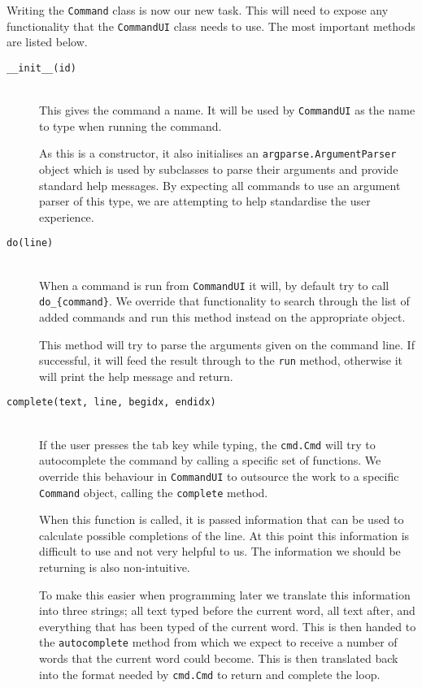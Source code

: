 \documentclass[twoside,a4paper]{report}
\begin{document}
Writing the \texttt{Command} class is now our new task. This will need to expose any functionality that the \texttt{CommandUI} class needs to use. The
most important methods are listed below.

\begin{description}
\item[\texttt{\_\_init\_\_(id)}] \hfill \\
This gives the command a name. It will be used by \texttt{CommandUI} as the name to type when running the command.

As this is a constructor, it also initialises an \texttt{argparse.ArgumentParser} object which is used by subclasses to parse their arguments and
provide standard help messages. By expecting all commands to use an argument parser of this type, we are attempting to help standardise the user
experience.

\item[\texttt{do(line)}] \hfill \\
When a command is run from \texttt{CommandUI} it will, by default try to call \texttt{do\_\{command\}}. We override that functionality to search
through the list of added commands and run this method instead on the appropriate object.

This method will try to parse the arguments given on the command line. If successful, it will feed the result through to the \texttt{run} method,
otherwise it will print the help message and return.

\item[\texttt{complete(text, line, begidx, endidx)}] \hfill \\
If the user presses the tab key while typing, the \texttt{cmd.Cmd} will try to autocomplete the command by calling a specific set of functions. We
override this behaviour in \texttt{CommandUI} to outsource the work to a specific \texttt{Command} object, calling the \texttt{complete} method.

When this function is called, it is passed information that can be used to calculate possible completions of the line. At this point this information
is difficult to use and not very helpful to us. The information we should be returning is also non-intuitive.

To make this easier when programming later we translate this information into three strings; all text typed before the current word, all text after,
and everything that has been typed of the current word. This is then handed to the \texttt{autocomplete} method from which we
expect to receive a number of words that the current word could become. This is then translated back into the format needed by \texttt{cmd.Cmd} to
return and complete the loop.


\end{description}
\end{document}
